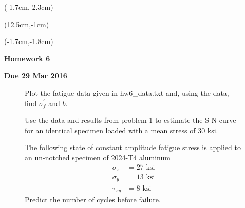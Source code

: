 \documentclass[12pt, oneside]{article}
\begin{document}


\begin{textblock*}{4cm}(-1.7cm,-2.3cm)
\end{textblock*}

\begin{textblock*}{8cm}(12.5cm,-1cm)
\end{textblock*}
\begin{textblock*}{13.5cm}(-1.7cm,-1.8cm)
\end{textblock*}

\vspace{1cm}

\begin{center}
\textbf{\Large Homework 6}

\textbf{Due 29 Mar 2016}
\end{center}

\begin{enumerate}

\begin{figure}[H]
	\item Plot the fatigue data given in hw6\_data.txt and, using the data, find $\sigma_f^\prime$ and $b$.
\end{figure}

\begin{figure}[H]
	\item Use the data and results from problem 1 to estimate the S-N curve for an identical specimen loaded with a mean stress of 30 ksi.
\end{figure}

\begin{figure}[H]
	\item The following state of constant amplitude fatigue stress is applied to an un-notched specimen of 2024-T4 aluminum
	\begin{align*}
	\sigma_x &= 27 \text{ ksi}\\
	\sigma_y &= 13 \text{ ksi}\\
	\tau_{xy} &= 8 \text{ ksi}
	\end{align*}
	Predict the number of cycles before failure.
\end{figure}

\end{enumerate}
\end{document}
